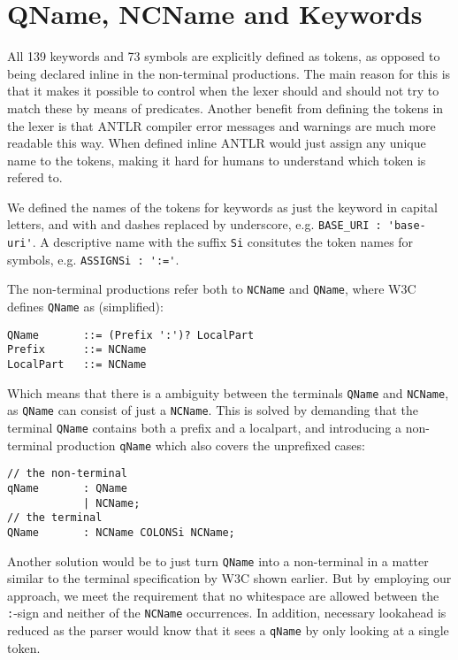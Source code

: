 \section{QName, NCName and Keywords}
\label{sect:rewritegrammar:keywordNCName}

All 139 keywords and 73 symbols are explicitly defined as tokens, as opposed to being declared inline in the non-terminal productions. The main reason for this is that it makes it possible to control when the lexer should and should not try to match these by means of predicates. Another benefit from defining the tokens in the lexer is that ANTLR compiler error messages and warnings are much more readable this way. When defined inline ANTLR would just assign any unique name to the tokens, making it hard for humans to understand which token is refered to. 

We defined the names of the tokens for keywords as just the keyword in capital letters, and with and dashes replaced by underscore, e.g. \verb!BASE_URI : 'base-uri'!. A descriptive name with the suffix \verb!Si! consitutes the token names for symbols, e.g. \verb!ASSIGNSi : ':='!.

The non-terminal productions refer both to \verb!NCName! and \verb!QName!, where W3C defines \verb!QName! as (simplified):
\begin{verbatim}
QName       ::= (Prefix ':')? LocalPart
Prefix      ::= NCName
LocalPart   ::= NCName
\end{verbatim}

Which means that there is a ambiguity between the terminals \verb!QName! and \verb!NCName!, as \verb!QName! can consist of just a \verb!NCName!. This is solved by demanding that the terminal \verb!QName! contains both a prefix and a localpart, and introducing a non-terminal production \verb!qName! which also covers the unprefixed cases:
\begin{verbatim}
// the non-terminal
qName       : QName
            | NCName;
// the terminal
QName       : NCName COLONSi NCName;
\end{verbatim}

Another solution would be to just turn \verb!QName! into a non-terminal in a matter similar to the terminal specification by W3C shown earlier. But by employing our approach, we meet the requirement that no whitespace are allowed between the \verb!:!-sign and neither of the \verb!NCName! occurrences. In addition, necessary lookahead is reduced as the parser would know that it sees a \verb!qName! by only looking at a single token.

